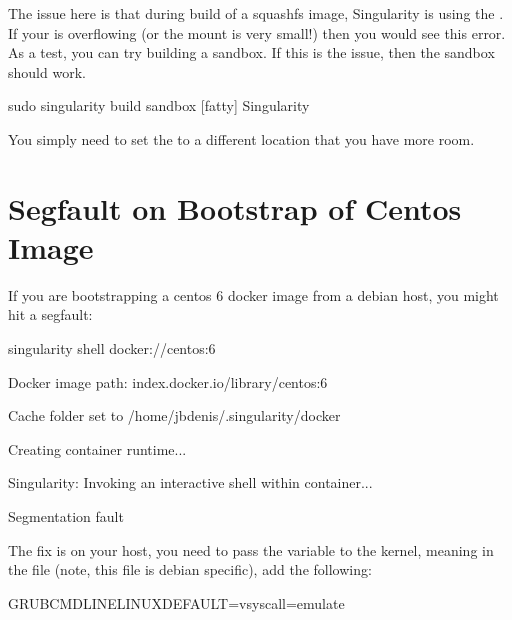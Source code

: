 \documentclass[letterpaper,10pt,english]{sphinxmanual}
\begin{document}
The issue here is that during build of a squashfs image, Singularity is
using the  . If your  is overflowing (or the mount is very small!) then
you would see this error. As a test, you can try building a sandbox. If this is the issue, then the sandbox should work.

%
\begin{sphinxVerbatim}[commandchars=\\\{\}]
sudo singularity build \PYGZhy{}\PYGZhy{}sandbox [fatty] Singularity
\end{sphinxVerbatim}

You simply need to set the  to a different location that you have more
room.


\section{Segfault on Bootstrap of Centos Image}
\label{\detokenize{troubleshooting:segfault-on-bootstrap-of-centos-image}}
If you are bootstrapping a centos 6 docker image from a debian host,
you might hit a segfault:

%
\begin{sphinxVerbatim}[commandchars=\\\{\}]
\PYGZdl{} singularity shell docker://centos:6

Docker image path: index.docker.io/library/centos:6

Cache folder set to /home/jbdenis/.singularity/docker

Creating container runtime...

Singularity: Invoking an interactive shell within container...


Segmentation fault
\end{sphinxVerbatim}

The fix is on your host, you need to pass the variable  to the kernel,
meaning in the file  (note, this file is debian specific), add the
following:

%
\begin{sphinxVerbatim}[commandchars=\\\{\}]
GRUB\PYGZus{}CMDLINE\PYGZus{}LINUX\PYGZus{}DEFAULT=\PYGZdq{}vsyscall=emulate\PYGZdq{}
\end{sphinxVerbatim}
\end{document}
